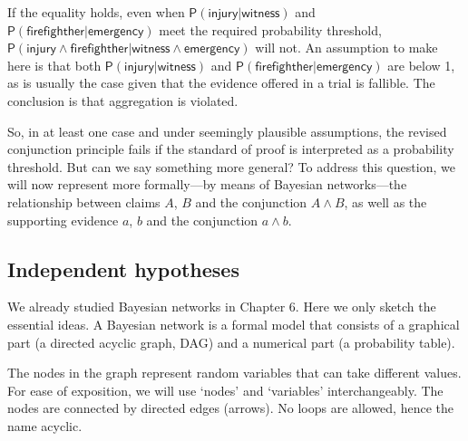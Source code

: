 \documentclass[
  10pt,
  dvipsnames,enabledeprecatedfontcommands]{scrartcl}
\newcommand{\pr}[1]{\ensuremath{\mathsf{P}(#1)}}
\begin{document}
\noindent If the equality holds, even when
\(\pr{\textsf{injury} \vert \textsf{witness}}\) and
\(\pr{\textsf{firefighther} \vert \textsf{emergency} }\) meet the
required probability threshold,
\(\pr{\textsf{injury} \wedge \textsf{firefighther} \vert \textsf{witness} \wedge \textsf{emergency}}\)
will not. An assumption to make here is that both
\(\pr{\textsf{injury} \vert \textsf{witness}}\) and
\(\pr{\textsf{firefighther} \vert \textsf{emergency} }\) are below 1, as
is usually the case given that the evidence offered in a trial is
fallible. The conclusion is that aggregation is violated.

So, in at least one case and under seemingly plausible assumptions, the
revised conjunction principle fails if the standard of proof is
interpreted as a probability threshold. But can we say something more
general? To address this question, we will now represent more
formally---by means of Bayesian networks---the relationship between
claims \(A\), \(B\) and the conjunction \(A\wedge B\), as well as the
supporting evidence \(a\), \(b\) and the conjunction \(a\wedge b\).

\pagebreak

\hypertarget{independent-hypotheses}{%
\subsection{Independent hypotheses}\label{independent-hypotheses}}

We already studied Bayesian networks in Chapter 6.
 Here we only sketch the essential ideas. A
Bayesian network is a formal model that consists of a graphical part (a
directed acyclic graph, \textsf{DAG}) and a numerical part (a
probability table).

The nodes in the graph represent random variables that can take
different values. For ease of exposition, we will use `nodes' and
`variables' interchangeably. The nodes are connected by directed edges
(arrows). No loops are allowed, hence the name acyclic.
\end{document}
